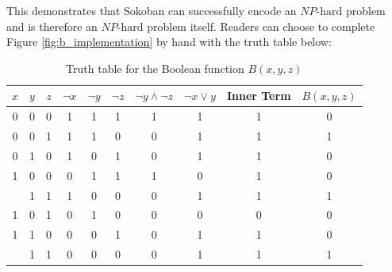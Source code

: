 This demonstrates that Sokoban can successfully encode an $NP\text{-hard}$ problem and is therefore an $NP\text{-hard}$ problem itself. Readers can choose to complete Figure \ref{fig:b_implementation} by hand with the truth table below:

\begin{table}[h]
\centering
\label{tab:sokoban_logic}
\renewcommand{\arraystretch}{1.2} %
\begin{tabular}{ @{} ccc | ccc | cc | c | c @{} }
\toprule
$x$ & $y$ & $z$ & $\neg x$ & $\neg y$ & $\neg z$ & $\neg y \land \neg z$ & $\neg x \lor y$ & Inner Term & $B(x,y,z)$ \\
\midrule
0 & 0 & 0 & 1 & 1 & 1 & 1 & 1 & 1 & 0 \\
0 & 0 & 1 & 1 & 1 & 0 & 0 & 1 & 1 & 1 \\
0 & 1 & 0 & 1 & 0 & 1 & 0 & 1 & 1 & 0 \\
1 & 0 & 0 & 0 & 1 & 1 & 1 & 0 & 1 & 0 \\
\addlinespace %
0 & 1 & 1 & 1 & 0 & 0 & 0 & 1 & 1 & 1 \\
1 & 0 & 1 & 0 & 1 & 0 & 0 & 0 & 0 & 0 \\
1 & 1 & 0 & 0 & 0 & 1 & 0 & 1 & 1 & 0 \\
\addlinespace %
1 & 1 & 1 & 0 & 0 & 0 & 0 & 1 & 1 & 1 \\
\bottomrule
\end{tabular}
\caption{Truth table for the Boolean function $B(x,y,z)$}
\end{table}


